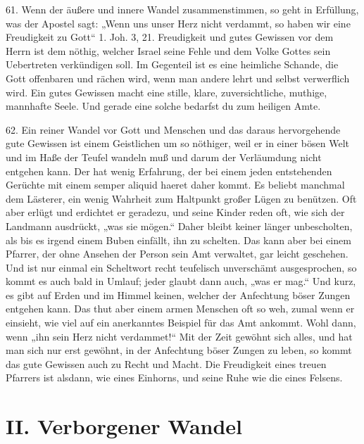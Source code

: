 61. Wenn der äußere und innere Wandel zusammenstimmen, so geht in Erfüllung, was der Apostel sagt: „Wenn uns unser Herz nicht verdammt, so haben wir eine Freudigkeit zu Gott“ 1. Joh. 3, 21. Freudigkeit und gutes Gewissen vor dem Herrn ist dem nöthig, welcher Israel seine Fehle und dem Volke Gottes sein Uebertreten verkündigen soll. Im Gegenteil ist es eine heimliche Schande, die Gott offenbaren und rächen wird, wenn man andere lehrt und selbst verwerflich wird. Ein gutes Gewissen macht eine stille, klare, zuversichtliche, muthige, mannhafte Seele. Und gerade eine solche bedarfst du zum heiligen Amte.

62. Ein reiner Wandel vor Gott und Menschen und das daraus hervorgehende gute Gewissen ist einem Geistlichen um so nöthiger, weil er in einer bösen Welt und im Haße der Teufel wandeln muß und darum der Verläumdung nicht entgehen kann. Der hat wenig Erfahrung, der bei einem jeden entstehenden Gerüchte mit einem semper aliquid haeret daher kommt. Es beliebt manchmal dem Lästerer, ein wenig Wahrheit zum Haltpunkt großer Lügen zu benützen. Oft aber erlügt und erdichtet er geradezu,
und seine Kinder reden oft, wie sich der Landmann ausdrückt, „was sie mögen.“ Daher bleibt keiner länger unbescholten, als bis es irgend einem Buben einfällt, ihn zu schelten. Das kann aber bei einem Pfarrer, der ohne Ansehen der Person sein Amt verwaltet, gar leicht geschehen. Und ist nur einmal ein Scheltwort recht teufelisch unverschämt ausgesprochen, so kommt es auch bald in Umlauf; jeder glaubt dann auch, „was er mag.“ Und kurz, es gibt auf Erden und im Himmel keinen, welcher der Anfechtung böser Zungen entgehen kann. Das thut aber einem armen Menschen oft so weh, zumal wenn er einsieht, wie viel auf ein anerkanntes Beispiel für das Amt ankommt. Wohl dann, wenn „ihn sein Herz nicht verdammet!“ Mit der Zeit gewöhnt sich alles, und hat man sich nur erst gewöhnt, in der Anfechtung böser Zungen zu leben, so kommt das gute Gewissen auch zu Recht und Macht. Die Freudigkeit eines treuen Pfarrers ist alsdann, wie eines Einhorns, und seine Ruhe wie die eines Felsens.

\section{II. Verborgener Wandel}

